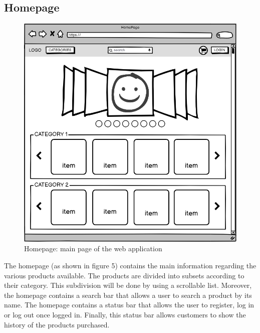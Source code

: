 \subsection{Homepage}
    \begin{figure}[H]
        \centering
        \includegraphics[width=\textwidth,height=0.7\textheight,keepaspectratio]{mockups/homepageMockup.png}
            \caption{Homepage: main page of the web application}
            \label{fig:Homepage}
    \end{figure}

The homepage (as shown in figure 5) contains the main information regarding the various products available.
The products are divided into subsets according to their category. This subdivision will be done by using a scrollable list. Moreover, the homepage contains a search bar that allows a user to search a product by its name.
The homepage contains a status bar that allows the user to register, log in or log out once logged in.
Finally, this status bar allows customers to show the history of the products purchased.

